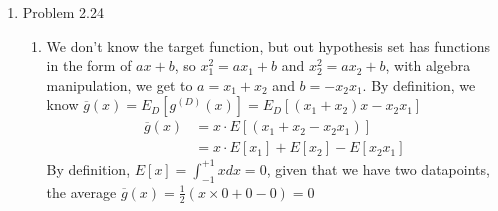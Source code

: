 \documentclass{article}
\begin{document}
\begin{enumerate}
        \item Problem 2.24
        \begin{enumerate}[label=(\alph*)]
            \item We don't know the target function, but out hypothesis set has functions in the form of $ax + b$, so $x^2_1 = ax_1 + b$ and $x^2_2 = ax_2 + b$, with algebra manipulation, we get to $a = x_1 + x_2$ and $b = -x_2x_1$. By definition, we know $\overline{g}(x) = E_D[g^{(D)}(x)] = E_D[(x_1+x_2)x - x_2x_1]$
            \begin{align*}
                    \overline{g}(x) &= x \cdot E[(x_1+x_2-x_2x_1)]\\
                    &= x \cdot E[x_1] + E[x_2] - E[x_2x_1]
            \end{align*}
            By definition, $E[x] = \int^{+1}_{-1}xdx = 0$, given that we have two datapoints, the average $\overline{g}(x) = \frac{1}{2}(x \times 0 + 0 - 0) = 0$
            

\end{enumerate}
\end{enumerate}
\end{document}
